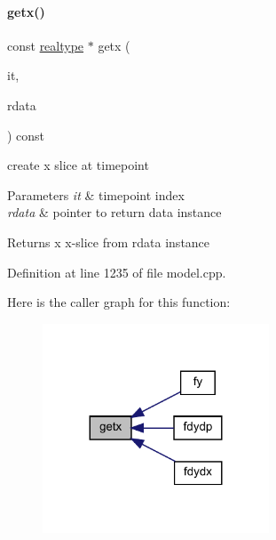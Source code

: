\paragraph{\texorpdfstring{getx()}{getx()}}
{\footnotesize\ttfamily const \mbox{\hyperlink{namespaceamici_a1bdce28051d6a53868f7ccbf5f2c14a3}{realtype}} $\ast$ getx (\begin{DoxyParamCaption}\item[{const int}]{it,  }\item[{const \mbox{\hyperlink{classamici_1_1_return_data}{Return\+Data}} $\ast$}]{rdata }\end{DoxyParamCaption}) const\hspace{0.3cm}{\ttfamily [protected]}}

create x slice at timepoint 
\begin{DoxyParams}{Parameters}
{\em it} & timepoint index \\
\hline
{\em rdata} & pointer to return data instance \\
\hline
\end{DoxyParams}
\begin{DoxyReturn}{Returns}
x x-\/slice from rdata instance 
\end{DoxyReturn}


Definition at line 1235 of file model.\+cpp.

Here is the caller graph for this function\+:
\nopagebreak
\begin{figure}[H]
\begin{center}
\leavevmode
\includegraphics[width=191pt]{classamici_1_1_model_abefad4b8b4ba76bad66f57504affca9b_icgraph}
\end{center}
\end{figure}
\mbox{\label{classamici_1_1_model_ae808a142aab292ef1b424bc3a0d924a0}} 
